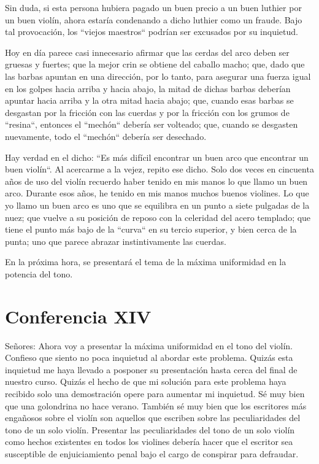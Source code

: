 \documentclass[12pt]{book}
\begin{document}
Sin duda, si esta persona hubiera pagado un buen precio a un buen luthier por un buen violín, ahora estaría condenando a dicho luthier como un fraude. Bajo tal provocación, los ``viejos maestros`` podrían ser excusados por su inquietud.

Hoy en día parece casi innecesario afirmar que las cerdas del arco deben ser gruesas y fuertes; que la mejor crin se obtiene del caballo macho; que, dado que las barbas apuntan en una dirección, por lo tanto, para asegurar una fuerza igual en los golpes hacia arriba y hacia abajo, la mitad de dichas barbas deberían apuntar hacia arriba y la otra mitad hacia abajo; que, cuando esas barbas se desgastan por la fricción con las cuerdas y por la fricción con los grumos de ``resina``, entonces el ``mechón`` debería ser volteado; que, cuando se desgasten nuevamente, todo el ``mechón`` debería ser desechado.

Hay verdad en el dicho: ``Es más difícil encontrar un buen arco que encontrar un buen violín``. Al acercarme a la vejez, repito ese dicho. Solo dos veces en cincuenta años de uso del violín recuerdo haber tenido en mis manos lo que llamo un buen arco. Durante esos años, he tenido en mis manos muchos buenos violines. Lo que yo llamo un buen arco es uno que se equilibra en un punto a siete pulgadas de la nuez; que vuelve a su posición de reposo con la celeridad del acero templado; que tiene el punto más bajo de la ``curva`` en su tercio superior, y bien cerca de la punta; uno que parece abrazar instintivamente las cuerdas.

En la próxima hora, se presentará el tema de la máxima uniformidad en la potencia del tono.

\section*{Conferencia XIV}
Señores: Ahora voy a presentar la máxima uniformidad en el tono del violín. Confieso que siento no poca inquietud al abordar este problema. Quizás esta inquietud me haya llevado a posponer su presentación hasta cerca del final de nuestro curso. Quizás el hecho de que mi solución para este problema haya recibido solo una demostración opere para aumentar mi inquietud. Sé muy bien que una golondrina no hace verano. También sé muy bien que los escritores más engañosos sobre el violín son aquellos que escriben sobre las peculiaridades del tono de un solo violín. Presentar las peculiaridades del tono de un solo violín como hechos existentes en todos los violines debería hacer que el escritor sea susceptible de enjuiciamiento penal bajo el cargo de conspirar para defraudar.
\end{document}
